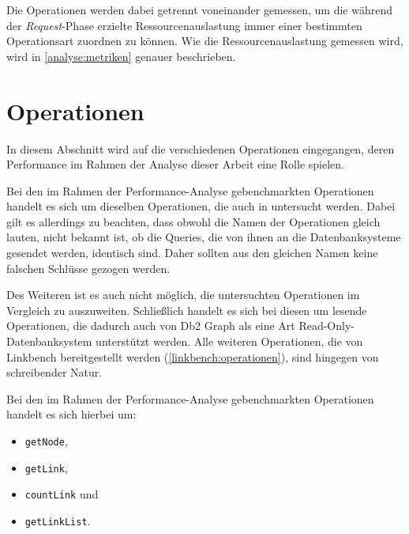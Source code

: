 Die Operationen werden dabei getrennt voneinander gemessen, um die während der \textit{Request}-Phase erzielte Ressourcenauslastung immer einer bestimmten Operationsart zuordnen zu können. Wie die Ressourcenauslastung gemessen wird, wird in \autoref{analyse:metriken} genauer beschrieben.

\section{Operationen}
\label{analyse:operationen}
In diesem Abschnitt wird auf die verschiedenen Operationen eingegangen, deren Performance im Rahmen der Analyse dieser Arbeit eine Rolle spielen. 

Bei den im Rahmen der Performance-Analyse gebenchmarkten Operationen handelt es sich um dieselben Operationen, die auch in \cite{sigmod_tian} untersucht werden. Dabei gilt es allerdings zu beachten, dass obwohl die Namen der Operationen gleich lauten, nicht bekannt ist, ob die Queries, die von ihnen an die Datenbanksysteme gesendet werden, identisch sind. Daher sollten aus den gleichen Namen keine falschen Schlüsse gezogen werden. 

Des Weiteren ist es auch nicht möglich, die untersuchten Operationen im Vergleich zu \cite{sigmod_tian} auszuweiten. Schließlich handelt es sich bei diesen um lesende Operationen, die dadurch auch von Db2 Graph als eine Art Read-Only-Datenbanksystem unterstützt werden. Alle weiteren Operationen, die von Linkbench bereitgestellt werden (\autoref{linkbench:operationen}), sind hingegen von schreibender Natur. 

Bei den im Rahmen der Performance-Analyse gebenchmarkten Operationen handelt es sich hierbei um:
\begin{itemize}
    \item \texttt{getNode},
    \item \texttt{getLink},
    \item \texttt{countLink} und
    \item \texttt{getLinkList}. 
\end{itemize}

